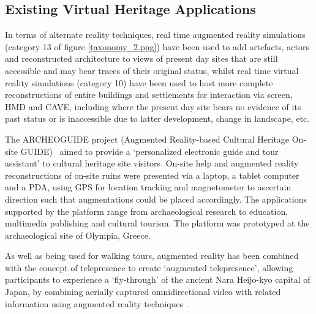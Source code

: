 
\subsection{Existing Virtual Heritage Applications}
\label{existing-virtual-heritage-applications}
In terms of alternate reality techniques, real time augmented reality simulations (category 13 of figure \ref{taxonomy_2.png}) have been used to add artefacts, actors and reconstructed architecture to views of present day sites that are still accessible and may bear traces of their original status, whilst real time virtual reality simulations (category 10) have been used to host more complete reconstructions of entire buildings and settlements for interaction via screen, HMD and CAVE, including where the present day site bears no evidence of its past status or is inaccessible due to latter development, change in landscape, etc.


The ARCHEOGUIDE project (Augmented Reality-based Cultural Heritage On-site GUIDE)~\cite{vlahakis:archeoguide} aimed to provide a `personalized electronic guide and tour assistant' to cultural heritage site visitors. On-site help and augmented reality reconstructions of on-site ruins were presented via a laptop, a tablet computer and a PDA, using GPS for location tracking and magnetometer to ascertain direction such that augmentations could be placed accordingly. The applications supported by the platform range from archaeological research to education, multimedia publishing and cultural tourism. The platform was prototyped at the archaeological site of Olympia, Greece.

As well as being used for walking tours, augmented reality has been combined with the concept of telepresence to create `augmented telepresence', allowing participants to experience a `fly-through' of the ancient Nara Heijo-kyo capital of Japan, by combining aerially captured omnidirectional video with related information using augmented reality techniques~\cite{Okura2006,Okura2011}.

